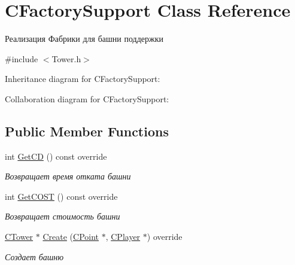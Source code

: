 \hypertarget{classCFactorySupport}{}\section{C\+Factory\+Support Class Reference}
\label{classCFactorySupport}


Реализация Фабрики для башни поддержки  




{\ttfamily \#include $<$Tower.\+h$>$}



Inheritance diagram for C\+Factory\+Support\+:


Collaboration diagram for C\+Factory\+Support\+:
\subsection*{Public Member Functions}
\begin{DoxyCompactItemize}
\item 
int \hyperlink{classCFactorySupport_a9285c2151ca2711ca0a2e1a7e34f21f6}{Get\+CD} () const override\hypertarget{classCFactorySupport_a9285c2151ca2711ca0a2e1a7e34f21f6}{}\label{classCFactorySupport_a9285c2151ca2711ca0a2e1a7e34f21f6}

\begin{DoxyCompactList}\small\item\em Возвращает время отката башни \end{DoxyCompactList}\item 
int \hyperlink{classCFactorySupport_aae018069928dac6582d67a3ac2560377}{Get\+C\+O\+ST} () const override\hypertarget{classCFactorySupport_aae018069928dac6582d67a3ac2560377}{}\label{classCFactorySupport_aae018069928dac6582d67a3ac2560377}

\begin{DoxyCompactList}\small\item\em Возвращает стоимость башни \end{DoxyCompactList}\item 
\hyperlink{classCTower}{C\+Tower} $\ast$ \hyperlink{classCFactorySupport_a0c4780403dc19a70a385a2f902b369cc}{Create} (\hyperlink{classCPoint}{C\+Point} $\ast$, \hyperlink{classCPlayer}{C\+Player} $\ast$) override
\begin{DoxyCompactList}\small\item\em Создает башню \end{DoxyCompactList}\end{DoxyCompactItemize}


